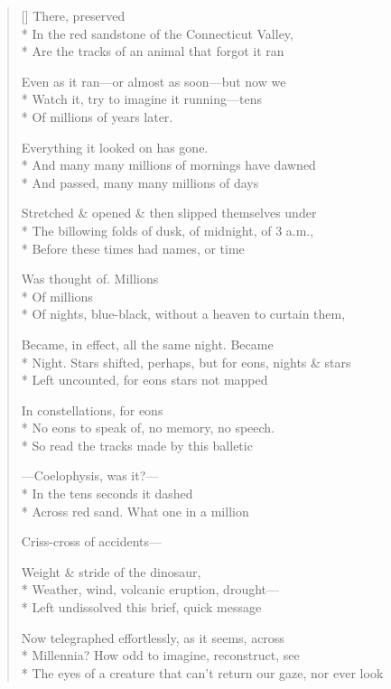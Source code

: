 \label{ch:triassic_sandstone}
\settowidth{\versewidth}{                                  So read the tracks made by this balletic}
\begin{verse}[\versewidth]
    There, preserved\\*
In the red sandstone of the Connecticut Valley,\\*
Are the tracks of an animal that forgot it ran 

Even as it ran---or almost as soon---but now we\\*
Watch it, try to imagine it running---tens \\*
Of millions of years later.

Everything it looked on has gone.\\*
And many many millions of mornings have dawned\\*
And passed, many many millions of days

Stretched \& opened \& then slipped themselves under\\*
The billowing folds of dusk, of midnight, of 3 a.m.,\\*
Before these times had names, or time

Was thought of.     Millions\\*
Of millions\\*
Of nights, blue-black, without a heaven to curtain them,

Became, in effect, all the same night. Became \\*
Night. Stars shifted, perhaps, but for eons, nights \& stars\\*
Left uncounted, for eons stars not mapped

In constellations, for eons\\*
No eons to speak of, no memory, no speech.\\*
                                  So read the tracks made by this balletic

---Coelophysis, was it?---\\*
 In the tens seconds it dashed\\*
Across red sand. What one in a million

Criss-cross of accidents---

Weight \& stride of the dinosaur,\\*
Weather, wind, volcanic eruption, drought---\\*
Left undissolved this brief, quick message

Now telegraphed effortlessly, as it seems, across\\*
Millennia?  How odd to imagine, reconstruct, see\\*
The eyes of a creature that can't return our gaze, nor ever look


\end{verse}
